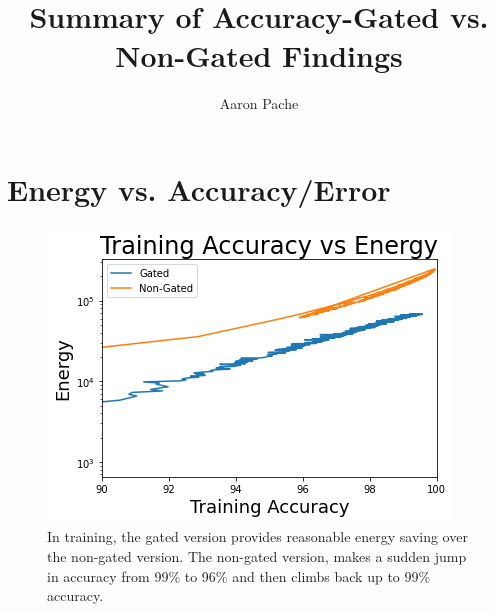 \documentclass[prl,superscriptaddress,showpacs,twocolumn]{revtex4-1}
\begin{document}
\title{Summary of Accuracy-Gated vs. Non-Gated Findings}
\author{Aaron Pache}

\maketitle

\noindent
\section{Energy vs. Accuracy/Error}
\begin{figure}[H]
    \centering
    \includegraphics[width=\linewidth]{figures/training_accuracy_vs_energy.png}
    \caption{In training, the gated version provides reasonable energy saving over the non-gated version. The non-gated version, makes a sudden jump in accuracy from 99\% to 96\% and then climbs back up to 99\% accuracy.}
    \label{fig:train_acc_vs_energy}
\end{figure}
\end{document}
